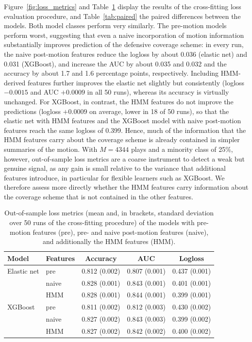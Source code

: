\documentclass[namedate,webpdf,modern,medium]{oup-authoring-template}
\begin{document}
Figure~\ref{fig:loss_metrics} and Table~\ref{tab:perf} display the results of the cross-fitting loss evaluation procedure, and Table~\ref{tab:paired} the paired differences between the models. Both model classes perform very similarly. The pre-motion models perform worst, suggesting that even a naive incorporation of motion information substantially improves prediction of the defensive coverage scheme: in every run, the naive post-motion features reduce the logloss by about 0.036 (elastic net) and 0.031 (XGBoost), and increase the AUC by about 0.035 and 0.032 and the accuracy by about 1.7 and 1.6 percentage points, respectively. Including HMM-derived features further improves the elastic net slightly but consistently (logloss $-0.0015$ and AUC $+0.0009$ in all 50 runs), whereas its accuracy is virtually unchanged. For XGBoost, in contrast, the HMM features do not improve the predictions (logloss $+0.0009$ on average, lower in 18 of 50 runs), so that the elastic net with HMM features and the XGBoost model with naive post-motion features reach the same logloss of 0.399. Hence, much of the information that the HMM features carry about the coverage scheme is already contained in simpler summaries of the motion. With $M = 4344$ plays and a minority class of 25\%, however, out-of-sample loss metrics are a coarse instrument to detect a weak but genuine signal, as any gain is small relative to the variance that additional features introduce, in particular for flexible learners such as XGBoost. We therefore assess more directly whether the HMM features carry information about the coverage scheme that is not contained in the other features.

\begin{table}[t!]
\centering
\caption{Out-of-sample loss metrics (mean and, in brackets, standard deviation over 50 runs of the cross-fitting procedure) of the models with pre-motion features (pre), pre- and naive post-motion features (naive), and additionally the HMM features (HMM).}
\label{tab:perf}
\begin{tabular}{llccc}
\hline
Model & Features & Accuracy & AUC & Logloss \\
\hline
Elastic net & pre & 0.812 (0.002) & 0.807 (0.001) & 0.437 (0.001) \\
 & naive & 0.828 (0.001) & 0.843 (0.001) & 0.401 (0.001) \\
 & HMM & 0.828 (0.001) & 0.844 (0.001) & 0.399 (0.001) \\
XGBoost & pre & 0.811 (0.002) & 0.812 (0.003) & 0.430 (0.002) \\
 & naive & 0.827 (0.002) & 0.843 (0.003) & 0.399 (0.002) \\
 & HMM & 0.827 (0.002) & 0.842 (0.002) & 0.400 (0.002) \\
\hline
\end{tabular}
\end{table}
\end{document}
